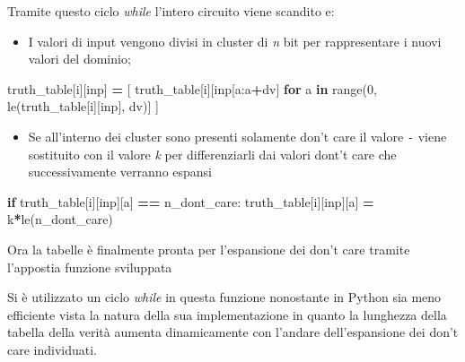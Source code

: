 \documentclass[
  italian,
]{book}
\newenvironment{Shaded}{\begin{snugshade}}{\end{snugshade}}
\newcommand{\BuiltInTok}[1]{#1}
\newcommand{\ControlFlowTok}[1]{\textcolor[rgb]{0.13,0.29,0.53}{\textbf{#1}}}
\newcommand{\DecValTok}[1]{\textcolor[rgb]{0.00,0.00,0.81}{#1}}
\newcommand{\KeywordTok}[1]{\textcolor[rgb]{0.13,0.29,0.53}{\textbf{#1}}}
\newcommand{\NormalTok}[1]{#1}
\newcommand{\OperatorTok}[1]{\textcolor[rgb]{0.81,0.36,0.00}{\textbf{#1}}}
\newcommand{\StringTok}[1]{\textcolor[rgb]{0.31,0.60,0.02}{#1}}
\providecommand{\tightlist}{%
  \setlength{\itemsep}{0pt}\setlength{\parskip}{0pt}}
\begin{document}
\newpage

Tramite questo ciclo \emph{while} l'intero circuito viene scandito e:

\begin{itemize}
\tightlist
\item
  I valori di input vengono divisi in cluster di \emph{n} bit per rappresentare i nuovi valori del dominio;
\end{itemize}

\begin{Shaded}
\begin{Highlighting}[]
\NormalTok{truth\_table[i][}\StringTok{\textquotesingle{}inp\textquotesingle{}}\NormalTok{] }\OperatorTok{=}\NormalTok{ [}
\NormalTok{   truth\_table[i][}\StringTok{\textquotesingle{}inp\textquotesingle{}}\NormalTok{[a:a}\OperatorTok{+}\NormalTok{dv]}
   \ControlFlowTok{for}\NormalTok{ a }\KeywordTok{in} \BuiltInTok{range}\NormalTok{(}\DecValTok{0}\NormalTok{, le(truth\_table[i][}\StringTok{\textquotesingle{}inp\textquotesingle{}}\NormalTok{], dv)]}
\NormalTok{ ]}
\end{Highlighting}
\end{Shaded}

\begin{itemize}
\tightlist
\item
  Se all'interno dei cluster sono presenti solamente don't care il valore \texttt{-} viene sostituito con il valore \emph{k} per differenziarli dai valori dont't care che successivamente verranno espansi
\end{itemize}

\begin{Shaded}
\begin{Highlighting}[]
\ControlFlowTok{if}\NormalTok{ truth\_table[i][}\StringTok{\textquotesingle{}inp\textquotesingle{}}\NormalTok{][a] }\OperatorTok{==}\NormalTok{ n\_dont\_care:}
\NormalTok{  truth\_table[i][}\StringTok{\textquotesingle{}inp\textquotesingle{}}\NormalTok{][a] }\OperatorTok{=} \StringTok{\textquotesingle{}k\textquotesingle{}}\OperatorTok{*}\NormalTok{le(n\_dont\_care)}
\end{Highlighting}
\end{Shaded}

Ora la tabelle è finalmente pronta per l'espansione dei don't care tramite l'appostia funzione sviluppata

Si è utilizzato un ciclo \emph{while} in questa funzione nonostante in Python sia meno efficiente vista la natura della sua implementazione in quanto la lunghezza della tabella della verità aumenta dinamicamente con l'andare dell'espansione dei don't care individuati.
\end{document}
